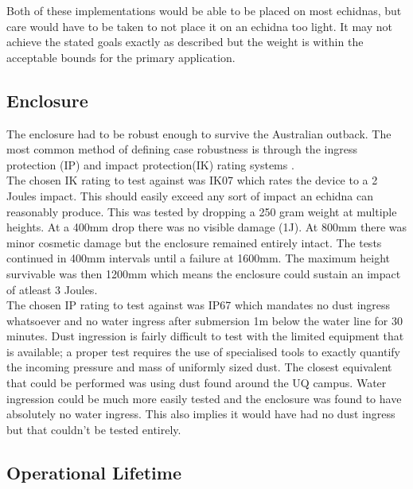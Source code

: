 \documentclass[12pt,openany,a4paper]{book}
\begin{document}
		Both of these implementations would be able to be placed on most echidnas, but care would have to be taken to not place it on an echidna too light. It may not achieve the stated goals exactly as described but the weight is within the acceptable bounds for the primary application.
		\subsection{Enclosure}
		The enclosure had to be robust enough to survive the Australian outback. The most common method of defining case robustness is through the ingress protection (IP) and impact protection(IK) rating systems \cite{luma2014}. \\
		
		The chosen IK rating to test against was IK07 which rates the device to a 2 Joules impact. This should easily exceed any sort of impact an echidna can reasonably produce. This was tested by dropping a 250 gram weight at multiple heights. At a 400mm drop there was no visible damage (1J). At 800mm there was minor cosmetic damage but the enclosure remained entirely intact. The tests continued in 400mm intervals until a failure at 1600mm. The maximum height survivable was then 1200mm which means the enclosure could sustain an impact of atleast 3 Joules. \\
		
		The chosen IP rating to test against was IP67 which mandates no dust ingress whatsoever and no water ingress after submersion 1m below the water line for 30 minutes. Dust ingression is fairly difficult to test with the limited equipment that is available; a proper test requires the use of specialised tools to exactly quantify the incoming pressure and mass of uniformly sized dust. The closest equivalent that could be performed was using dust found around the UQ campus. Water ingression could be much more easily tested and the enclosure was found to have absolutely no water ingress. This also implies it would have had no dust ingress but that couldn't be tested entirely.

		\subsection{Operational Lifetime}
		
\end{document}
